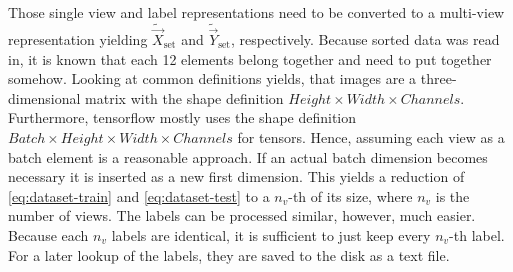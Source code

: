 Those single view and label representations need to be converted to a multi-view representation yielding $\tilde{\vec{X}}_{\text{set}}$ and $\tilde{\vec{Y}}_{\text{set}}$, respectively.
Because sorted data was read in, it is known that each 12 elements belong together and need to put together somehow.
Looking at common definitions yields, that images are a three-dimensional matrix with the shape definition $Height \times Width \times Channels$.
Furthermore, tensorflow mostly uses the shape definition $Batch \times Height \times Width \times Channels$ for tensors.
Hence, assuming each view as a batch element is a reasonable approach.
If an actual batch dimension becomes necessary it is inserted as a new first dimension.
This yields a reduction of \eqref{eq:dataset-train} and \eqref{eq:dataset-test} to a $n_v$-th of its size, where $n_v$ is the number of views.
The labels can be processed similar, however, much easier.
Because each $n_v$ labels are identical, it is sufficient to just keep every $n_v$-th label.
For a later lookup of the labels, they are saved to the disk as a text file.